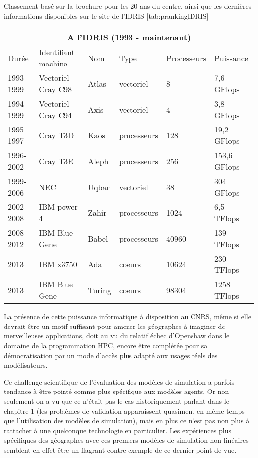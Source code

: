 \begin{table}[!htbp]
\begin{sidecaption}[fortoc]{Classement basé sur la brochure pour les 20 ans du centre, ainsi que les dernières informations disponibles sur le site de l'IDRIS}
	[tab:prankingIDRIS]
	\centering
	\begin{tabular}{@{}llllll@{}}
\toprule
\multicolumn{6}{c}{A l'IDRIS (1993 - maintenant)} \\ \midrule
Durée & Identifiant machine & Nom & Type & Processeurs & Puissance \\ \midrule
1993-1999 & Vectoriel Cray C98 & Atlas & vectoriel & 8 & 7,6 GFlops \\
1994-1999 & Vectoriel Cray C94 & Axis & vectoriel & 4 & 3,8 GFlops \\
1995-1997 & Cray T3D & Kaos & processeurs & 128 & 19,2 GFlops \\
1996-2002 & Cray T3E & Aleph & processeurs & 256 & 153,6 GFlops \\
1999-2006 & NEC & Uqbar & vectoriel & 38 & 304 GFlops \\
2002-2008 & IBM power 4 & Zahir & processeurs & 1024 & 6,5 TFlops \\
2008-2012 & IBM Blue Gene & Babel & processeurs & 40960 & 139 TFlops \\
2013 & IBM x3750 & Ada & coeurs & 10624 & 230 TFlops \\
2013 & IBM Blue Gene & Turing & coeurs & 98304 & 1258 TFlops \\ \bottomrule
\end{tabular}
\end{sidecaption}
\end{table}

La présence de cette puissance informatique à disposition au CNRS, même si elle devrait être un motif suffisant pour amener les géographes à imaginer de merveilleuses applications, doit au vu du relatif échec d'Openshaw dans le domaine de la programmation HPC, encore être complétée pour sa démocratisation par un mode d'accès plus adapté aux usages réels des modélisateurs.


Ce challenge scientifique de l'évaluation des modèles de simulation a parfois tendance à être pointé comme plus spécifique aux modèles agents. Or non seulement on a vu que ce n'était pas le cas historiquement parlant dans le chapitre 1 (les problèmes de validation apparaissent quasiment en même temps que l'utilisation des modèles de simulation), mais en plus ce n'est pas non plus à rattacher à une quelconque technologie en particulier. Les expériences plus spécifiques des géographes avec ces premiers modèles de simulation non-linéaires semblent en effet être un flagrant contre-exemple de ce dernier point de vue.

